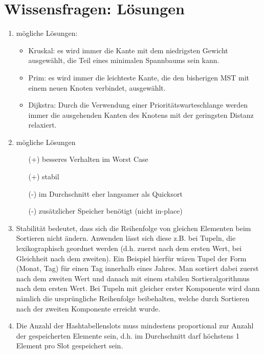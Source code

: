 \documentclass{scrartcl}
\begin{document}
\section*{Wissensfragen: Lösungen}
\begin{enumerate}[(1)]

\item mögliche Lösungen:
\begin{itemize}
\item Kruskal: es wird immer die Kante mit dem niedrigsten Gewicht ausgewählt, die Teil eines minimalen Spannbaums sein kann.
\item Prim: es wird immer die leichteste Kante, die den bisherigen MST mit einem neuen Knoten verbindet, ausgewählt.
\item Dijkstra: Durch die Verwendung einer Prioritätswarteschlange werden immer die ausgehenden Kanten des Knotens mit der geringsten Distanz relaxiert.
\end{itemize}

\item mögliche Lösungen
\begin{itemize}
\item[(+)] besseres Verhalten im Worst Case
\item[(+)] stabil
\item[(-)] im Durchschnitt eher langsamer als Quicksort
\item[(-)] zusätzlicher Speicher benötigt (nicht in-place)
\end{itemize}

\item Stabilität bedeutet, dass sich die Reihenfolge von gleichen Elementen beim Sortieren nicht ändern. Anwenden lässt sich diese z.B. bei Tupeln, die lexikographisch geordnet werden (d.h. zuerst nach dem ersten Wert, bei Gleichheit nach dem zweiten). Ein Beispiel hierfür wären Tupel der Form (Monat, Tag) für einen Tag innerhalb eines Jahres. Man sortiert dabei zuerst nach dem zweiten Wert und danach mit einem stabilen Sortieralgorithmus nach dem ersten Wert. Bei Tupeln mit gleicher erster Komponente wird dann nämlich die ursprüngliche Reihenfolge beibehalten, welche durch Sortieren nach der zweiten Komponente erreicht wurde.

\item Die Anzahl der Hashtabellenslots muss mindestens proportional zur Anzahl der gespeicherten Elemente sein, d.h. im Durchschnitt darf höchstens 1 Element pro Slot gespeichert sein.


\end{enumerate}
\end{document}
